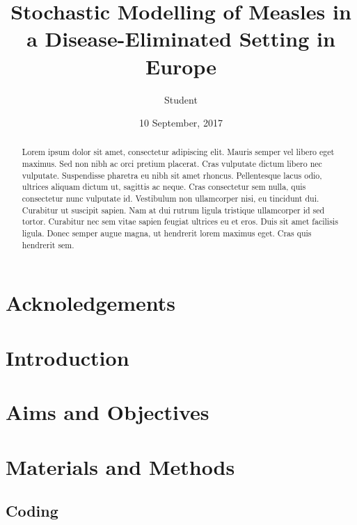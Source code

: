 \documentclass[11pt, a4paper]{article}
\begin{document}
\title{Stochastic Modelling of Measles in a Disease-Eliminated Setting in Europe}
\author{Student}
\date{10 September, 2017}
\maketitle

\begin{abstract}
\noindent
Lorem ipsum dolor sit amet, consectetur adipiscing elit. Mauris semper vel libero
eget maximus. Sed non nibh ac orci pretium placerat. Cras vulputate dictum libero
nec vulputate. Suspendisse pharetra eu nibh sit amet rhoncus. Pellentesque lacus
odio, ultrices aliquam dictum ut, sagittis ac neque. Cras consectetur sem nulla,
quis consectetur nunc vulputate id. Vestibulum non ullamcorper nisi, eu tincidunt
dui. Curabitur ut suscipit sapien. Nam at dui rutrum ligula tristique ullamcorper
id sed tortor. Curabitur nec sem vitae sapien feugiat ultrices eu et eros.
Duis sit amet facilisis ligula. Donec semper augue magna, ut hendrerit lorem
maximus eget. Cras quis hendrerit sem.
\end{abstract}
\clearpage
\tableofcontents
\clearpage
\section{Acknoledgements}

\section{Introduction}

\section{Aims and Objectives}

\section{Materials and Methods}
  \subsection{Coding}
  
\end{document}

